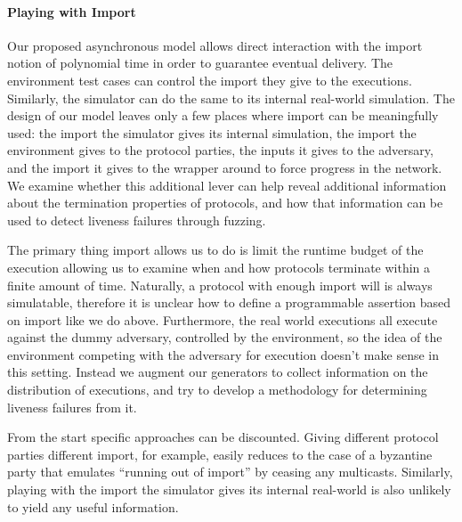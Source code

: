 
\paragraph{Playing with Import}
Our proposed asynchronous model allows direct interaction with the import
notion of polynomial time in order to guarantee eventual delivery.  The
environment test cases can control the import they give to the executions.
Similarly, the simulator can do the same to its internal real-world simulation.
The design of our model leaves only a few places where import can be
meaningfully used: the import the simulator gives its internal simulation, the
import the environment gives to the protocol parties, the inputs it gives to
the adversary, and the import it gives to the wrapper around \F to force
progress in the network.
We examine whether this additional lever can help reveal additional information
about the termination properties of protocols, and how that information can be
used to detect liveness failures through fuzzing.

The primary thing import allows us to do is limit the runtime budget of the
execution allowing us to examine when and how protocols terminate within a
finite amount of time.  Naturally, a protocol with enough import will is always
simulatable, therefore it is unclear how to define a programmable assertion
based on import like we do above.  Furthermore, the real world executions all
execute against the dummy adversary, controlled by the environment, so the idea
of the environment competing with the adversary for execution doesn't make
sense in this setting.  Instead we augment our generators to collect
information on the distribution of executions, and try to develop a methodology
for determining liveness failures from it.

From the start specific approaches can be discounted.  Giving different
protocol parties different import, for example, easily reduces to the case of a
byzantine party that emulates ``running out of import'' by ceasing any
multicasts.  Similarly, playing with the import the simulator gives its
internal real-world is also unlikely to yield any useful information.

